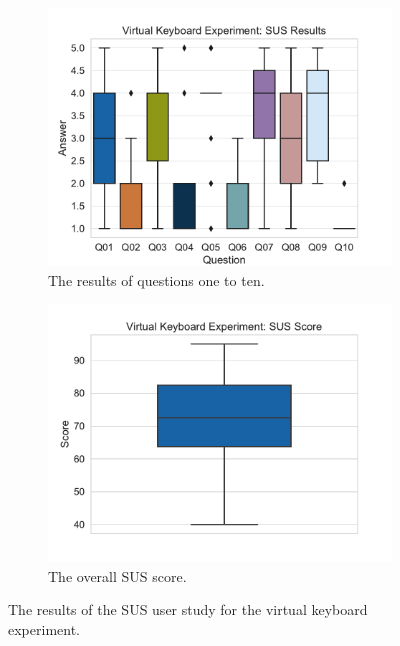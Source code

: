 \begin{figure}[H]
	\centering
	\begin{subfigure}[t]{.5\linewidth}%
		\centering
		\includegraphics[width=\linewidth]{figures/evaluation/res_exp_vk.pdf}
		\caption{The results of questions one to ten.}\label{fig:res-exp-vk}
	\end{subfigure}%
	\begin{subfigure}[t]{.5\linewidth}%
		\centering
		\includegraphics[width=\linewidth]{figures/evaluation/score_exp_vk.pdf}
		\caption{The overall \gls{SUS} score.}\label{fig:score-exp-vk}
	\end{subfigure}%
	\caption[Virtual keyboard SUS results]{The results of the \gls{SUS} user study for the virtual keyboard experiment.}\label{fig:exp-vk-stats}
\end{figure}

